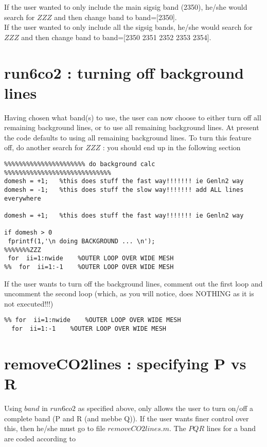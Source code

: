 \documentclass[11pt]{article}
\begin{document}
If the user wanted to only include the main sigsig band (2350), he/she would 
search for $ZZZ$ and then change band to band=[2350].\\
If the user wanted to only include all the sigsig bands, he/she would 
search for $ZZZ$ and then change band to band=[2350 2351 2352 2353 2354].\\

\section{run6co2 : turning off background lines}
Having chosen what band(s) to use, the user can now choose to either
turn off all remaining background lines, or to use all remaining
background lines. At present the code defaults to using all remaining 
background lines. To turn this feature off, do another search for $ZZZ$ : you 
should end up in the following section

\begin{verbatim}
%%%%%%%%%%%%%%%%%%%%%% do background calc  %%%%%%%%%%%%%%%%%%%%%%%%%%%%% 
domesh = +1;   %this does stuff the fast way!!!!!!! ie Genln2 way 
domesh = -1;   %this does stuff the slow way!!!!!!! add ALL lines everywhere 
 
domesh = +1;   %this does stuff the fast way!!!!!!! ie Genln2 way 
 
if domesh > 0 
 fprintf(1,'\n doing BACKGROUND ... \n'); 
%%%%%%%ZZZ 
 for  ii=1:nwide    %OUTER LOOP OVER WIDE MESH  
%%  for  ii=1:-1    %OUTER LOOP OVER WIDE MESH  
\end{verbatim}

If the user wants to turn off the background lines, comment out the first loop
and uncomment the second loop (which, as you will notice, does NOTHING as it
is not executed!!!)
\begin{verbatim}
%% for  ii=1:nwide    %OUTER LOOP OVER WIDE MESH  
  for  ii=1:-1    %OUTER LOOP OVER WIDE MESH  
\end{verbatim}

\section{removeCO2lines : specifying P vs R}
Using $band$ in $run6co2$ as specified above, only allows the user to turn 
on/off a complete band (P and R (and mebbe Q)). If the user wants finer control
over this, then he/she must go to file $removeCO2lines.m$.
The $PQR$ lines for a band are coded according to 
\end{document}

